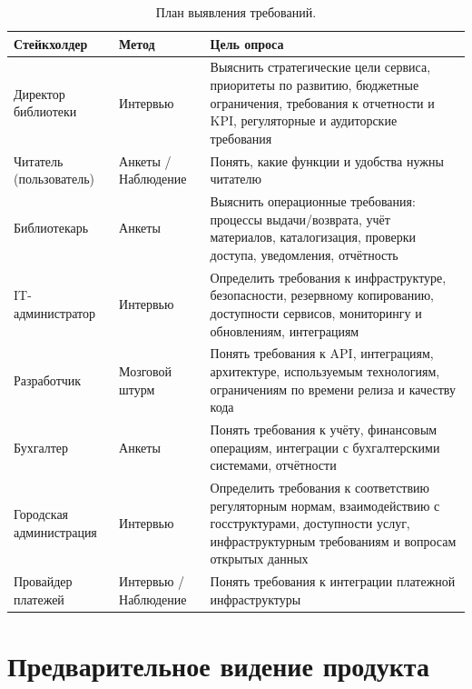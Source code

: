\documentclass[12pt]{report}
\begin{document}
	\begin{table}[H]
		\centering
		\begin{tabular}{|>{\raggedright\arraybackslash}p{}|>{\raggedright\arraybackslash}p{}|>{\raggedright\arraybackslash}p{}|}
			\hline
			\textbf{Стейкхолдер} & \textbf{Метод} &	 \textbf{Цель опроса} \\
			\hline
			Директор библиотеки & Интервью & Выяснить стратегические цели сервиса, приоритеты по развитию, бюджетные ограничения, требования к отчетности и KPI, регуляторные и аудиторские требования \\
			\hline
			Читатель (пользователь) & Анкеты / Наблюдение & Понять, какие функции и удобства нужны читателю \\
			\hline
			Библиотекарь & Анкеты & Выяснить операционные требования: процессы выдачи/возврата, учёт материалов, каталогизация, проверки доступа, уведомления, отчётность \\
			\hline
			IT-администратор & Интервью & Определить требования к инфраструктуре, безопасности, резервному копированию, доступности сервисов, мониторингу и обновлениям, интеграциям \\
			\hline
			Разработчик & Мозговой штурм & Понять требования к API, интеграциям, архитектуре, используемым технологиям, ограничениям по времени релиза и качеству кода \\
			\hline
			Бухгалтер & Анкеты & Понять требования к учёту, финансовым операциям, интеграции с бухгалтерскими системами, отчётности \\
			\hline
			Городская администрация & Интервью & Определить требования к соответствию регуляторным нормам, взаимодействию с госструктурами, доступности услуг, инфраструктурным требованиям и вопросам открытых данных \\
			\hline
			Провайдер платежей & Интервью / Наблюдение & Понять требования к интеграции платежной инфраструктуры \\
			\hline
		\end{tabular}
		\caption{План выявления требований.}
		\label{tab:requirements}
	\end{table}
	\newpage
	
	
	\section*{Предварительное видение продукта}
	
\end{document}
